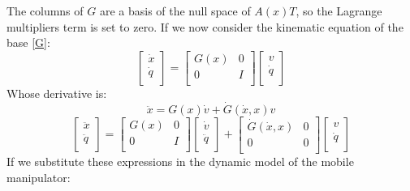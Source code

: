 The columns of $G$ are a basis of the null space of $A(x)T$, so the Lagrange multipliers term is set to zero.
If we now consider the kinematic equation of the base \ref{G}:
\begin{equation}
	\left[\begin{matrix}\dot{x}\\\dot{q}\\\end{matrix}\right]=\left[\begin{matrix}G(x)&0\\0&I\\\end{matrix}\right]\left[\begin{matrix}v\\\dot{q}\\\end{matrix}\right]
	\end{equation}
Whose derivative is:
\begin{equation}
	\ddot{x}=G\left(x\right)\dot{v}+\dot{G}\left(\dot{x},x\right)v
\end{equation}
\begin{equation}
	\left[\begin{matrix}\ddot{x}\\\ddot{q}\\\end{matrix}\right]=\left[\begin{matrix}G(x)&0\\0&I\\\end{matrix}\right]\left[\begin{matrix}\dot{v}\\\ddot{q}\\\end{matrix}\right]+\left[\begin{matrix}\dot{G}\left(\dot{x},x\right)&0\\0&0\\\end{matrix}\right]\left[\begin{matrix}v\\\dot{q}\\\end{matrix}\right]
\end{equation}
If we substitute these expressions in the dynamic model of the mobile manipulator:
